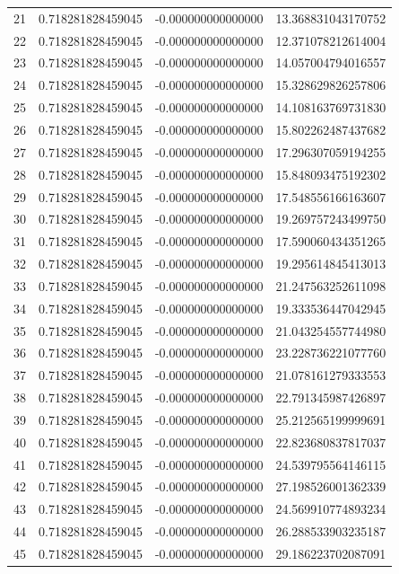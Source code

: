 \documentclass{article}
\begin{document}
\begin{table}[htb]
\begin{tabular}{c c c c}
21 & 0.718281828459045 & -0.000000000000000 & 13.368831043170752 \\
22 & 0.718281828459045 & -0.000000000000000 & 12.371078212614004 \\
23 & 0.718281828459045 & -0.000000000000000 & 14.057004794016557 \\
24 & 0.718281828459045 & -0.000000000000000 & 15.328629826257806 \\
25 & 0.718281828459045 & -0.000000000000000 & 14.108163769731830 \\
26 & 0.718281828459045 & -0.000000000000000 & 15.802262487437682 \\
27 & 0.718281828459045 & -0.000000000000000 & 17.296307059194255 \\
28 & 0.718281828459045 & -0.000000000000000 & 15.848093475192302 \\
29 & 0.718281828459045 & -0.000000000000000 & 17.548556166163607 \\
30 & 0.718281828459045 & -0.000000000000000 & 19.269757243499750 \\
31 & 0.718281828459045 & -0.000000000000000 & 17.590060434351265 \\
32 & 0.718281828459045 & -0.000000000000000 & 19.295614845413013 \\
33 & 0.718281828459045 & -0.000000000000000 & 21.247563252611098 \\
34 & 0.718281828459045 & -0.000000000000000 & 19.333536447042945 \\
35 & 0.718281828459045 & -0.000000000000000 & 21.043254557744980 \\
36 & 0.718281828459045 & -0.000000000000000 & 23.228736221077760 \\
37 & 0.718281828459045 & -0.000000000000000 & 21.078161279333553 \\
38 & 0.718281828459045 & -0.000000000000000 & 22.791345987426897 \\
39 & 0.718281828459045 & -0.000000000000000 & 25.212565199999691 \\
40 & 0.718281828459045 & -0.000000000000000 & 22.823680837817037 \\
41 & 0.718281828459045 & -0.000000000000000 & 24.539795564146115 \\
42 & 0.718281828459045 & -0.000000000000000 & 27.198526001362339 \\
43 & 0.718281828459045 & -0.000000000000000 & 24.569910774893234 \\
44 & 0.718281828459045 & -0.000000000000000 & 26.288533903235187 \\
45 & 0.718281828459045 & -0.000000000000000 & 29.186223702087091 \\

\end{tabular}
\end{table}
\end{document}
